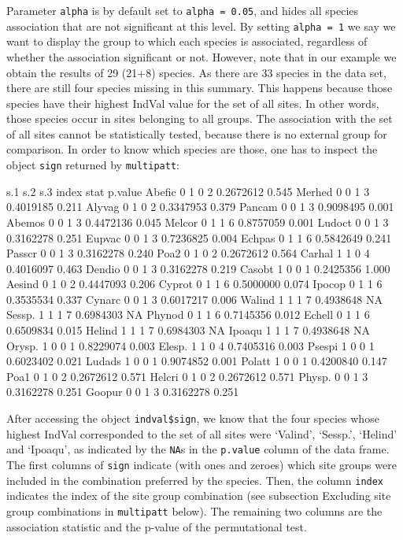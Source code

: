 \documentclass[11pt,a4paper]{article}
\begin{document}
Parameter \texttt{alpha} is by default set to \texttt{alpha = 0.05}, and hides all species association that are not significant at this level. By setting \texttt{alpha = 1} we say we want to display the group to which each species is associated, regardless of whether the association significant or not. However, note that in our example we obtain the results of 29 (21+8) species. As there are 33 species in the data set, there are still four species missing in this summary. This happens because those species have their highest IndVal value for the set of all sites. In other words, those species occur in sites belonging to all groups. The association with the set of all sites cannot be statistically tested, because there is no external group for comparison. In order to know which species are those, one has to inspect the object \texttt{sign} returned by \texttt{multipatt}:
\begin{Schunk}
\begin{Soutput}
       s.1 s.2 s.3 index      stat p.value
Abefic   0   1   0     2 0.2672612   0.545
Merhed   0   0   1     3 0.4019185   0.211
Alyvag   0   1   0     2 0.3347953   0.379
Pancam   0   0   1     3 0.9098495   0.001
Abemos   0   0   1     3 0.4472136   0.045
Melcor   0   1   1     6 0.8757059   0.001
Ludoct   0   0   1     3 0.3162278   0.251
Eupvac   0   0   1     3 0.7236825   0.004
Echpas   0   1   1     6 0.5842649   0.241
Passcr   0   0   1     3 0.3162278   0.240
Poa2     0   1   0     2 0.2672612   0.564
Carhal   1   1   0     4 0.4016097   0.463
Dendio   0   0   1     3 0.3162278   0.219
Casobt   1   0   0     1 0.2425356   1.000
Aesind   0   1   0     2 0.4447093   0.206
Cyprot   0   1   1     6 0.5000000   0.074
Ipocop   0   1   1     6 0.3535534   0.337
Cynarc   0   0   1     3 0.6017217   0.006
Walind   1   1   1     7 0.4938648      NA
Sessp.   1   1   1     7 0.6984303      NA
Phynod   0   1   1     6 0.7145356   0.012
Echell   0   1   1     6 0.6509834   0.015
Helind   1   1   1     7 0.6984303      NA
Ipoaqu   1   1   1     7 0.4938648      NA
Orysp.   1   0   0     1 0.8229074   0.003
Elesp.   1   1   0     4 0.7405316   0.003
Psespi   1   0   0     1 0.6023402   0.021
Ludads   1   0   0     1 0.9074852   0.001
Polatt   1   0   0     1 0.4200840   0.147
Poa1     0   1   0     2 0.2672612   0.571
Helcri   0   1   0     2 0.2672612   0.571
Physp.   0   0   1     3 0.3162278   0.251
Goopur   0   0   1     3 0.3162278   0.251
\end{Soutput}
\end{Schunk}
After accessing the object \texttt{indval\$sign}, we know that the four species whose highest IndVal corresponded to the set of all sites were `Valind', `Sessp.', `Helind' and `Ipoaqu', as indicated by the \texttt{NA}s in the \texttt{p.value} column of the data frame. The first columns of \texttt{sign} indicate (with ones and zeroes) which site groups were included in the combination preferred by the species. Then, the column \texttt{index} indicates the index of the site group combination (see subsection Excluding site group combinations in \texttt{multipatt} below). The remaining two columns are the association statistic and the p-value of the permutational test.
\end{document}
